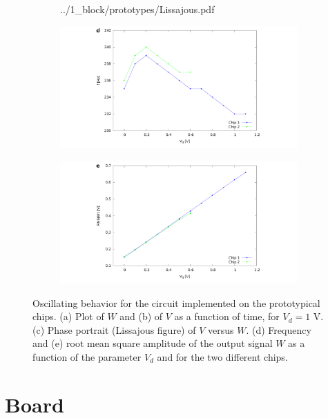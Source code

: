 \begin{figure}[H]
\begin{subfigure}{.39\textwidth}
        {../1_block/prototypes/Lissajous.pdf}
    \end{subfigure}
    \begin{subfigure}{.49\textwidth}
        \includegraphics[width=\linewidth,trim={10cm 0 9cm 0},clip,left]
        {../1_block/prototypes/freq_prot.pdf}
    \end{subfigure}
    \begin{subfigure}{.49\textwidth}
        \centering
        \includegraphics[width=\linewidth,trim={9cm 0 10cm 0},clip,right]
        {../1_block/prototypes/rms_prot.pdf}
    \end{subfigure}
    \caption{Oscillating behavior for the circuit implemented on
    the prototypical chips. (a) Plot of $W$ and (b) of $V$ as a
    function of time, for $V_d=1$ V.
    (c) Phase portrait (Lissajous figure) of $V$ versus $W$. (d)
    Frequency and (e) root mean square amplitude of the
    output signal $W$ as a function of the parameter $V_d$ and for
    the two different chips.}
    \label{fig:oscillation prototype}
\end{figure}

\section{Board}\label{sec:board}

